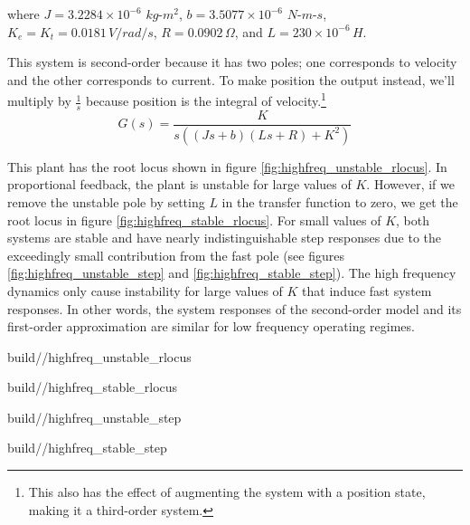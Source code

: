 where $J = 3.2284 \times 10^{-6}$ $kg$-$m^2$, $b = 3.5077 \times 10^{-6}$
$N$-$m$-$s$, $K_e = K_t = 0.0181 \,V/rad/s$, $R = 0.0902 \,\Omega$, and
$L = 230 \times 10^{-6} \,H$.

This system is second-order because it has two poles; one corresponds to
velocity and the other corresponds to current. To make position the output
instead, we'll multiply by $\frac{1}{s}$ because position is the integral of
velocity.\footnote{This also has the effect of augmenting the system with a
position state, making it a third-order system.}
\begin{equation*}
  G(s) = \frac{K}{s((Js + b)(Ls + R) + K^2)}
\end{equation*}

This \gls{plant} has the root locus shown in figure
\ref{fig:highfreq_unstable_rlocus}. In proportional feedback, the \gls{plant} is
unstable for large values of $K$. However, if we remove the unstable pole by
setting $L$ in the transfer function to zero, we get the root locus in figure
\ref{fig:highfreq_stable_rlocus}. For small values of $K$, both \glspl{system}
are stable and have nearly indistinguishable \glspl{step response} due to the
exceedingly small contribution from the fast pole (see figures
\ref{fig:highfreq_unstable_step} and \ref{fig:highfreq_stable_step}). The high
frequency dynamics only cause instability for large values of $K$ that induce
fast \glspl{system response}. In other words, the \glspl{system response} of the
second-order model and its first-order approximation are similar for low
frequency operating regimes.
\begin{bookfigure}
  \begin{minisvg}{2}{build/\sectionpath/highfreq_unstable_rlocus}
    \caption{Root locus of second-order DC brushed motor plant augmented with
      position}
    \label{fig:highfreq_unstable_rlocus}
  \end{minisvg}
  \hfill
  \begin{minisvg}{2}{build/\sectionpath/highfreq_stable_rlocus}
    \caption{Root locus of first-order DC brushed motor plant augmented with
      position}
    \label{fig:highfreq_stable_rlocus}
  \end{minisvg}
\end{bookfigure}
\begin{bookfigure}
  \begin{minisvg}{2}{build/\sectionpath/highfreq_unstable_step}
    \caption{Step response of second-order DC brushed motor plant augmented with
      position}
    \label{fig:highfreq_unstable_step}
  \end{minisvg}
  \hfill
  \begin{minisvg}{2}{build/\sectionpath/highfreq_stable_step}
    \caption{Step response of first-order DC brushed motor plant augmented with
      position}
    \label{fig:highfreq_stable_step}
  \end{minisvg}
\end{bookfigure}

